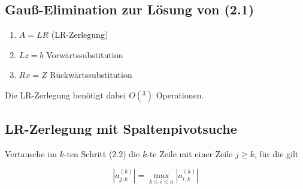 \documentclass[a4paper,10pt]{scrartcl}
\newtheorem[L]{satz}{Satz}[section]
\newtheorem[S]{beweis}{Beweis}
\newtheorem[S]{beh}{Behauptung}
\begin{document}
\subsection{Gauß-Elimination zur Lösung von (2.1)} %

\begin{enumerate}
  \item $A = LR$ (LR-Zerlegung)
  \item $Lz = b$ Vorwärtssubstitution
  \item $Rx = Z$ Rückwärtssubstitution
\end{enumerate}

Die LR-Zerlegung benötigt dabei $O(^3)$ Operationen.

\subsection{LR-Zerlegung mit Spaltenpivotsuche}

Vertausche im $k$-ten Schritt (2.2) die $k$-te Zeile mit einer Zeile $j \geq k$, für die gilt

\[
  |a_{j,k}^{(k)} | = \max \limits_{k \leq i \leq n} | a_{i,k}^{(k)} |
\]
\end{document}
